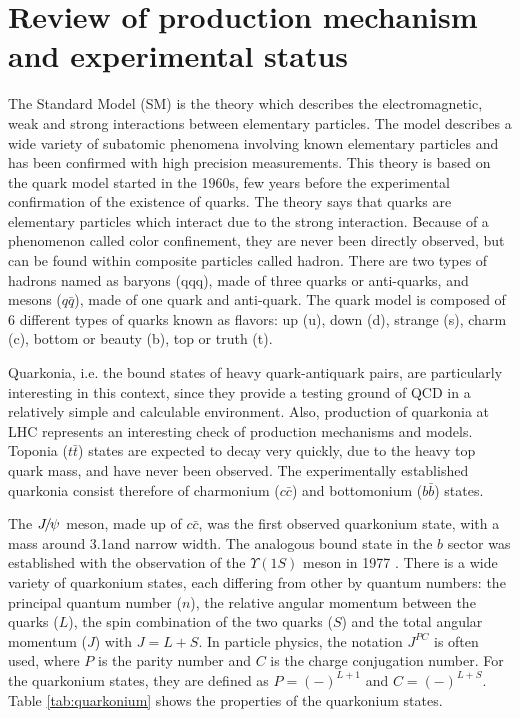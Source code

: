 \chapter{Review of production mechanism and experimental status}
\label{sec:review}
The Standard Model (SM) is the theory which describes the electromagnetic, weak
and strong interactions between elementary particles. The model describes a
wide variety of subatomic phenomena involving known elementary particles and
has been confirmed with high precision measurements. This theory is based on
the quark model started in the 1960s\cite{GellMann:1964nj,Zweig:1981pd}, few
years before the experimental confirmation of the existence of quarks. The
theory says that quarks are elementary particles which interact due to the
strong interaction. Because of a phenomenon called color confinement, they are
never been directly observed,  but can be found within composite particles
called hadron. There are two types of hadrons named as baryons (qqq), made of
three quarks or anti-quarks, and mesons ($q\bar{q}$), made of one quark and
anti-quark. The quark model is composed of 6 different types of quarks known as
flavors: up (u), down (d), strange (s), charm (c), bottom or beauty (b), top or
truth (t).

Quarkonia, i.e. the bound states of heavy quark-antiquark pairs, are
particularly interesting in this context, since they provide a testing ground
of QCD in a relatively simple and calculable environment. Also, production of
quarkonia at LHC represents an interesting check of production mechanisms and
models. Toponia ($t\bar{t}$) states are expected to decay very quickly, due to
the heavy top quark mass, and have never been observed. The experimentally
established quarkonia consist therefore of charmonium ($c\bar{c}$) and
bottomonium ($b\bar{b}$) states.

The ${{J\mskip -3mu/\mskip -2mu\psi\mskip 2mu}}$ meson, made up of $c\bar{c}$, was the first observed quarkonium
state\cite{PhysRevLett.33.1404}, with a mass around 3.1\gev and narrow width. The analogous 
bound state in the $b$ sector was established with the observation of the 
$\Upsilon(1S)$ meson in 1977 \cite{Herb:1977ek}. 
There is a wide variety of quarkonium states, each differing from other by quantum
numbers: the principal quantum number ($n$), the relative angular momentum
between the quarks ($L$), the spin combination of the two quarks ($S$) and the total
angular momentum ($J$) with $J = L + S$. In particle physics, the notation $J^{PC}$ is
often used, where $P$ is the parity number and $C$ is the charge conjugation number.
For the quarkonium states, they are defined as $P=(-)^{L+1}$ and $C=(-)^{L+S}$.
Table \ref{tab:quarkonium} shows the properties of the quarkonium states. 

